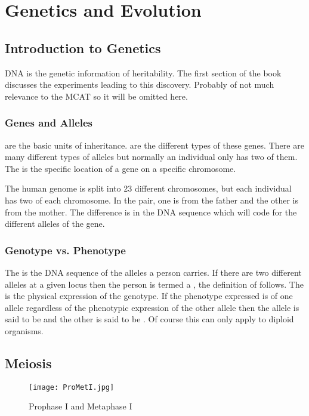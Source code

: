 \documentclass[../Bio_chemistryReview.tex]{subfiles}
\begin{document}
\chapter{Genetics and Evolution}
\section{Introduction to Genetics}
DNA is the genetic information of heritability. The first section of the book
discusses the experiments leading to this discovery. Probably of not much
relevance to the MCAT so it will be omitted here.

\subsection{Genes and Alleles}
 are the basic units of inheritance.  are the
different types of these genes. There are many different types of alleles but
normally an individual only has two of them. The  is the specific
location of a gene on a specific chromosome.\par

The human genome is split into 23 different chromosomes, but each individual has
two of each chromosome. In the pair, one is from the father and the other is
from the mother. The difference is in the DNA sequence which will code for the
different alleles of the gene.

\subsection{Genotype vs. Phenotype}
The  is the DNA sequence of the alleles a person carries. If
there are two different alleles at a given locus then the person is termed a
, the definition of  follows. The
 is the physical expression of the genotype. If the phenotype
expressed is of one allele regardless of the phenotypic expression of the other
allele then the allele is said to be  and the other is
said to be . Of course this can only apply to diploid
organisms.\par

\section{Meiosis}
\begin{wrapfigure}{r}{0.45\textwidth}
  \centering
  \vspace{-11pt}
  \texttt{[image: ProMetI.jpg]}
  \caption{Prophase I and Metaphase I}
  \label{fig:pro}
\end{wrapfigure}
\end{document}
